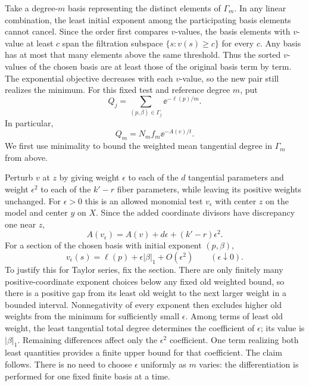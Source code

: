 Take a degree-$m$ basis representing the distinct elements of $\Gamma_m$. In any linear combination, the least initial exponent among the participating basis elements cannot cancel. Since the order first compares $v$-values, the basis elements with $v$-value at least $c$ span the filtration subspace $\{s:v(s)\ge c\}$ for every $c$. Any basis has at most that many elements above the same threshold. Thus the sorted $v$-values of the chosen basis are at least those of the original basis term by term. The exponential objective decreases with each $v$-value, so the new pair still realizes the minimum. For this fixed test and reference degree $m$, put
\begin{equation}\label{eq:center-q-b}
 Q_j=\sum_{(p,\beta)\in\Gamma_j}\ee^{-\ell(p)/m}.
\end{equation}
In particular,
\begin{equation}\label{eq:center-q-minimum}
 Q_m=N_m f_m \ee^{-{A}(v)/t}.
\end{equation}
We first use minimality to bound the weighted mean tangential degree in $\Gamma_m$ from above.

Perturb $v$ at $z$ by giving weight $\epsilon$ to each of the $d$ tangential parameters and weight $\epsilon^2$ to each of the $k'-r$ fiber parameters, while leaving its positive weights unchanged. For $\epsilon>0$ this is an allowed monomial test $v_\epsilon$ with center $z$ on the model and center $y$ on $X$. Since the added coordinate divisors have discrepancy one near $z$,
\begin{equation}\label{eq:center-discrepancy-variation}
 {A}(v_\epsilon)={A}(v)+d\epsilon+(k'-r)\epsilon^2.
\end{equation}
For a section of the chosen basis with initial exponent $(p,\beta)$,
\begin{equation}\label{eq:center-order-variation}
 v_\epsilon(s)=\ell(p)+\epsilon|\beta|_1+O(\epsilon^2)
 \qquad(\epsilon\downarrow0).
\end{equation}
To justify this for Taylor series, fix the section. There are only finitely many positive-coordinate exponent choices below any fixed old weighted bound, so there is a positive gap from its least old weight to the next larger weight in a bounded interval. Nonnegativity of every exponent then excludes higher old weights from the minimum for sufficiently small $\epsilon$. Among terms of least old weight, the least tangential total degree determines the coefficient of $\epsilon$; its value is $|\beta|_1$. Remaining differences affect only the $\epsilon^2$ coefficient. One term realizing both least quantities provides a finite upper bound for that coefficient. The claim follows. There is no need to choose $\epsilon$ uniformly as $m$ varies: the differentiation is performed for one fixed finite basis at a time.

